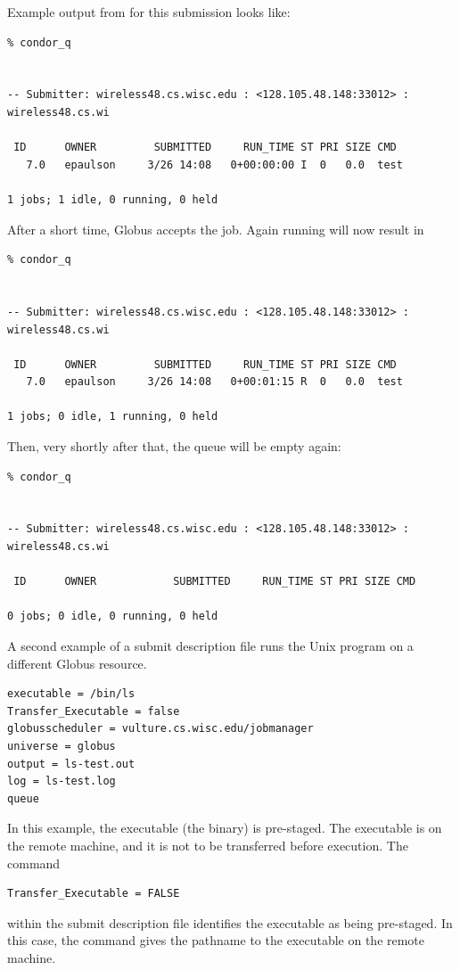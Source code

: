 Example output from 
 for this submission looks like:
\begin{verbatim}
% condor_q


-- Submitter: wireless48.cs.wisc.edu : <128.105.48.148:33012> : wireless48.cs.wi

 ID      OWNER         SUBMITTED     RUN_TIME ST PRI SIZE CMD
   7.0   epaulson     3/26 14:08   0+00:00:00 I  0   0.0  test

1 jobs; 1 idle, 0 running, 0 held
\end{verbatim}

After a short time, Globus accepts the job.
Again running  will now result in

\begin{verbatim}
% condor_q


-- Submitter: wireless48.cs.wisc.edu : <128.105.48.148:33012> : wireless48.cs.wi

 ID      OWNER         SUBMITTED     RUN_TIME ST PRI SIZE CMD
   7.0   epaulson     3/26 14:08   0+00:01:15 R  0   0.0  test

1 jobs; 0 idle, 1 running, 0 held
\end{verbatim}

Then, very shortly after that, the queue will be empty again:

\begin{verbatim}
% condor_q


-- Submitter: wireless48.cs.wisc.edu : <128.105.48.148:33012> : wireless48.cs.wi

 ID      OWNER            SUBMITTED     RUN_TIME ST PRI SIZE CMD

0 jobs; 0 idle, 0 running, 0 held
\end{verbatim}


A second example of a submit description file runs the Unix 
program on a different Globus resource.

\begin{verbatim}
executable = /bin/ls
Transfer_Executable = false
globusscheduler = vulture.cs.wisc.edu/jobmanager
universe = globus
output = ls-test.out
log = ls-test.log
queue
\end{verbatim} 

In this example, the executable (the binary) is pre-staged.
The executable is on the remote machine, and it is not to
be transferred before execution.
The command
\begin{verbatim}
Transfer_Executable = FALSE
\end{verbatim}
within the submit description file identifies the executable
as being pre-staged.
In this case, the 
command gives the pathname to the executable on the remote machine.

